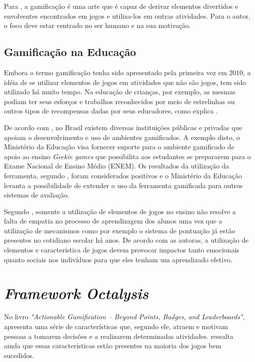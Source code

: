 Para , a gamificação é uma arte que é capaz de derivar elementos divertidos e envolventes encontrados em jogos e utiliza-los
em outras atividades. Para o autor, o foco deve estar centrado no ser humano e na sua motivação.

\subsection{Gamificação na Educação}
Embora o termo gamificação tenha sido apresentado pela primeira vez em 2010, a idéia de se utilizar
elementos de jogos em atividades que não são jogos, tem sido utilizado há muito tempo. Na educação
de crianças, por exemplo, as mesmas podiam ter seus esforços e trabalhos reconhecidos por meio
de estrelinhas ou outros tipos de recompensas dadas por seus educadores, como explica .

De acordo com , no Brasil existem diversas instituições públicas e privadas que apoiam o desenvolvimento e uso de ambientes
gamificados. A exemplo disto, o Ministério da Educação visa fornecer suporte para o ambiente gamificado de apoio ao ensino \textit{Geekie games} que possibilita
aos estudantes se prepararem para o Exame Nacional de Ensino Médio (ENEM). Os resultados da utilização da ferramenta, segundo , 
foram considerados positivos e o Ministério da Educação levanta a possibilidade de extender o uso da ferramenta gamificada para outros sistemas de avaliação.

Segundo , somente a utilização de elementos de jogos no ensino não resolve a falta de empatia no processo de aprendizagem dos alunos
uma vez que a utilização de mecanismos como por exemplo o sistema de pontuação já estão presentes no cotidiano escolar há anos. De acordo com as autoras, 
a utilização de elementos e característica de jogos devem provocar impactos tanto emocionais quanto sociais nos indivíduos para que eles tenham um aprendizado
efetivo. 


\section{\textit{Framework Octalysis}}
No livro \textit{"Actionable Gamification – Beyond Points, Badges, and Leaderboards"},  apresenta uma série
de características que, segundo ele, atraem e motivam pessoas a tomarem decisões e a realizarem determinadas atividades.
 ressalta ainda que essas características estão presentes na maioria dos jogos bem sucedidos.

